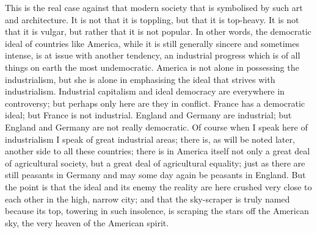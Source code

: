 \documentclass{book}
\begin{document}
This is the real case against that modern society that is symbolised by such art and architecture. It is not that it is toppling, but that it is top-heavy. It is not that it is vulgar, but rather that it is not popular. In other words, the democratic ideal of countries like America, while it is still generally sincere and sometimes intense, is at issue with another tendency, an industrial progress which is of all things on earth the most undemocratic. America is not alone in possessing the industrialism, but she is alone in emphasising the ideal that strives with industrialism. Industrial capitalism and ideal democracy are everywhere in controversy; but perhaps only here are they in conflict. France has a democratic ideal; but France is not industrial. England and Germany are industrial; but England and Germany are not really democratic. Of course when I speak here of industrialism I speak of great industrial areas; there is, as will be noted later, another side to all these countries; there is in America itself not only a great deal of agricultural society, but a great deal of agricultural equality; just as there are still peasants in Germany and may some day again be peasants in England. But the point is that the ideal and its enemy the reality are here crushed very close to each other in the high, narrow city; and that the sky-scraper is truly named because its top, towering in such insolence, is scraping the stars off the American sky, the very heaven of the American spirit.
\end{document}
